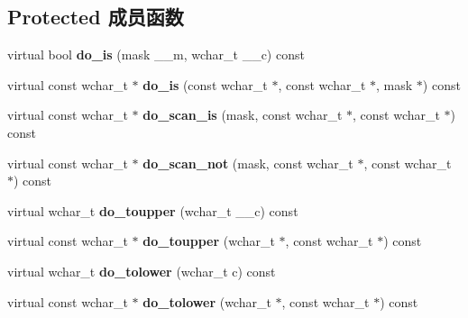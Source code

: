 \subsection*{Protected 成员函数}
\begin{DoxyCompactItemize}
\item 
\mbox{\label{classctype__byname_3_01wchar__t_01_4_a647fd9166b424f6a4b6a52689aa9bf8f}} 
virtual bool {\bfseries do\+\_\+is} (mask \+\_\+\+\_\+m, wchar\+\_\+t \+\_\+\+\_\+c) const
\item 
\mbox{\label{classctype__byname_3_01wchar__t_01_4_acb1f2ed39f3ca0a1d525bcb76cd1882b}} 
virtual const wchar\+\_\+t $\ast$ {\bfseries do\+\_\+is} (const wchar\+\_\+t $\ast$, const wchar\+\_\+t $\ast$, mask $\ast$) const
\item 
\mbox{\label{classctype__byname_3_01wchar__t_01_4_af25321c8831f994b47d961ac15ea13dc}} 
virtual const wchar\+\_\+t $\ast$ {\bfseries do\+\_\+scan\+\_\+is} (mask, const wchar\+\_\+t $\ast$, const wchar\+\_\+t $\ast$) const
\item 
\mbox{\label{classctype__byname_3_01wchar__t_01_4_abd32afd48c6cca57016d35cd8e06b40a}} 
virtual const wchar\+\_\+t $\ast$ {\bfseries do\+\_\+scan\+\_\+not} (mask, const wchar\+\_\+t $\ast$, const wchar\+\_\+t $\ast$) const
\item 
\mbox{\label{classctype__byname_3_01wchar__t_01_4_af5324c247296654b8139f706f4d3391c}} 
virtual wchar\+\_\+t {\bfseries do\+\_\+toupper} (wchar\+\_\+t \+\_\+\+\_\+c) const
\item 
\mbox{\label{classctype__byname_3_01wchar__t_01_4_ab03f6a188ba3865a1da14f065b633b51}} 
virtual const wchar\+\_\+t $\ast$ {\bfseries do\+\_\+toupper} (wchar\+\_\+t $\ast$, const wchar\+\_\+t $\ast$) const
\item 
\mbox{\label{classctype__byname_3_01wchar__t_01_4_a44d3681d42e3cd40ff4afbdbf5a38be5}} 
virtual wchar\+\_\+t {\bfseries do\+\_\+tolower} (wchar\+\_\+t c) const
\item 
\mbox{\label{classctype__byname_3_01wchar__t_01_4_a9b0ad3934bddf1b30892bf624173226c}} 
virtual const wchar\+\_\+t $\ast$ {\bfseries do\+\_\+tolower} (wchar\+\_\+t $\ast$, const wchar\+\_\+t $\ast$) const
\end{DoxyCompactItemize}
